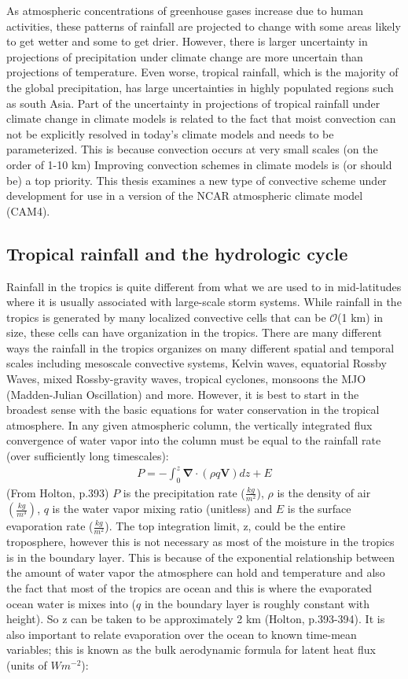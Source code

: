 \documentclass[letterpaper,12pt,titlepage,oneside,final]{book}
\begin{document}
As atmospheric concentrations of greenhouse gases increase due to human activities, these patterns of rainfall are projected to change with some areas likely to get wetter and some to get drier. However, there is larger uncertainty in projections of precipitation under climate change are more uncertain than projections of temperature. Even worse, tropical rainfall, which is the majority of the global precipitation, has large uncertainties in highly populated regions such as south Asia. Part of the uncertainty in projections of tropical rainfall under climate change in climate models is related to the fact that moist convection can not be explicitly resolved in today's climate models and needs to be parameterized. This is because convection occurs at very small scales (on the order of 1-10 km) Improving convection schemes in climate models is (or should be) a top priority. This thesis examines a new type of convective scheme under development for use in a version of the NCAR atmospheric climate model (CAM4).
\subsection{Tropical rainfall and the hydrologic cycle}
Rainfall in the tropics is quite different from what we are used to in mid-latitudes where it is usually associated with large-scale storm systems. While rainfall in the tropics is generated by many localized convective cells that can be $\mathcal{O}$(1 km) in size, these cells can have organization in the tropics. There are many different ways the rainfall in the tropics organizes on many different spatial and temporal scales including mesoscale convective systems, Kelvin waves, equatorial Rossby Waves, mixed Rossby-gravity waves, tropical cyclones, monsoons the MJO (Madden-Julian Oscillation) and more. However, it is best to start in the broadest sense with the basic equations for water conservation in the tropical atmosphere. In any given atmospheric column, the vertically integrated flux convergence of water vapor into the column must be equal to the rainfall rate (over sufficiently long timescales):
\begin{align}
P=-\int_{0}^{z}\mathbf{\nabla}\cdot(\rho{q}\mathbf{V})dz+E
\end{align}
(From Holton, p.393)
$P$ is the precipitation rate ($\frac{kg}{m^{2}}$), $\rho$ is the density of air $(\frac{kg}{m^{3}})$, $q$ is the water vapor mixing ratio (unitless) and $E$ is the surface evaporation rate ($\frac{kg}{m^{2}}$). The top integration limit, z, could be the entire troposphere, however this is not necessary as most of the moisture in the tropics is in the boundary layer. This is because of the exponential relationship between the amount of water vapor the atmosphere can hold and temperature and also the fact that most of the tropics are ocean and this is where the evaporated ocean water is mixes into ($q$ in the boundary layer is roughly constant with height). So z can be taken to be approximately 2 km (Holton, p.393-394). It is also important to relate evaporation over the ocean to known time-mean variables; this is known as the bulk aerodynamic formula for latent heat flux (units of $W m^{-2}$):
\end{document}
